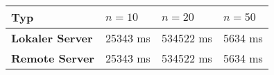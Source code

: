 \begin{tabular}{l|lll}
\rowcolor{heading}
\color{white}\textbf{Typ} &
\color{white}\textbf{$n = 10$} &
\color{white}\textbf{$n = 20$} &
\color{white}\textbf{$n = 50$} \\
\hline
\cellcolor{editorGray}\textbf{Lokaler Server} & 25343 ms & 534522 ms
& 5634 ms\\
\cellcolor{editorGray}\textbf{Remote Server} & 25343 ms & 534522 ms &
5634 ms\\
\hline
\end{tabular}
